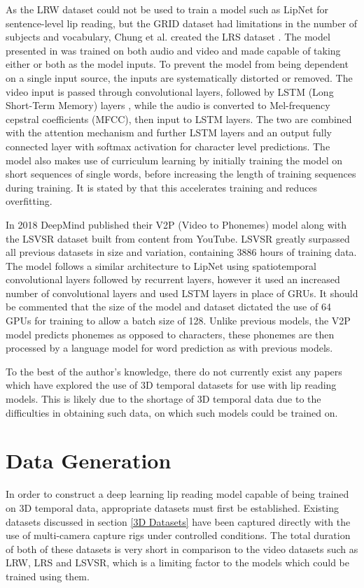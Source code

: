 As the LRW dataset could not be used to train a model such as LipNet for sentence-level lip reading, but the GRID dataset had limitations in the number of subjects and vocabulary, Chung et al. created the LRS dataset \cite{Chung2017}.
The model presented in \cite{Chung2017} was trained on both audio and video and made capable of taking either or both as the model inputs.
To prevent the model from being dependent on a single input source, the inputs are systematically distorted or removed.
The video input is passed through convolutional layers, followed by LSTM (Long Short-Term Memory) layers \cite{Cheng2016}, while the audio is converted to Mel-frequency cepstral coefficients (MFCC), then input to LSTM layers.
The two are combined with the attention mechanism and further LSTM layers and an output fully connected layer with softmax activation for character level predictions.
The model also makes use of curriculum learning by initially training the model on short sequences of single words, before increasing the length of training sequences during training.
It is stated by \cite{Chung2017} that this accelerates training and reduces overfitting.

In 2018 DeepMind published their V2P (Video to Phonemes) model \cite{Shillingford2018} along with the LSVSR dataset built from content from YouTube. 
LSVSR greatly surpassed all previous datasets in size and variation, containing 3886 hours of training data.
The model follows a similar architecture to LipNet \cite{Assael2016} using spatiotemporal convolutional layers followed by recurrent layers, however it used an increased number of convolutional layers and used LSTM layers in place of GRUs.
It should be commented that the size of the model and dataset dictated the use of 64 GPUs for training to allow a batch size of 128.
Unlike previous models, the V2P model predicts phonemes as opposed to characters, these phonemes are then processed by a language model for word prediction as with previous models.

To the best of the author's knowledge, there do not currently exist any papers which have explored the use of 3D temporal datasets for use with lip reading models. 
This is likely due to the shortage of 3D temporal data due to the difficulties in obtaining such data, on which such models could be trained on.

\section{Data Generation}
In order to construct a deep learning lip reading model capable of being trained on 3D temporal data, appropriate datasets must first be established.
Existing datasets \cite{Tzirakis2019, Cudeiro2019} discussed in section \ref{3D Datasets} have been captured directly with the use of multi-camera capture rigs under controlled conditions.
The total duration of both of these datasets is very short in comparison to the video datasets such as LRW, LRS and LSVSR, which is a limiting factor to the models which could be trained using them.

